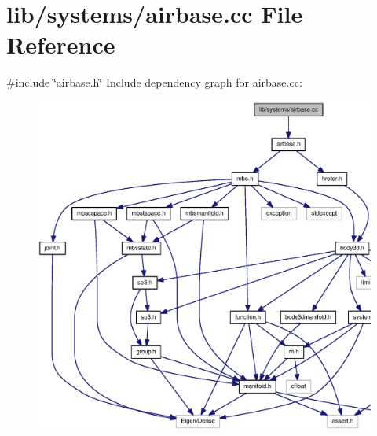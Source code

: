 \section{lib/systems/airbase.cc \-File \-Reference}
\label{airbase_8cc}
{\ttfamily \#include \char`\"{}airbase.\-h\char`\"{}}\*
\-Include dependency graph for airbase.\-cc\-:
\nopagebreak
\begin{figure}[H]
\begin{center}
\leavevmode
\includegraphics[width=350pt]{airbase_8cc__incl}
\end{center}
\end{figure}
